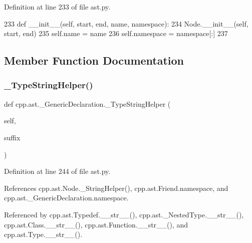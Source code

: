 Definition at line 233 of file ast.\+py.


\begin{DoxyCode}
233     \textcolor{keyword}{def }\_\_init\_\_(self, start, end, name, namespace):
234         Node.\_\_init\_\_(self, start, end)
235         self.name = name
236         self.namespace = namespace[:]
237 
\end{DoxyCode}


\subsection{Member Function Documentation}
\mbox{\label{classcpp_1_1ast_1_1__GenericDeclaration_a2ab2d07ccfa5d51ed153e82004c49e98}} 
\subsubsection{\texorpdfstring{\+\_\+\+Type\+String\+Helper()}{\_TypeStringHelper()}}
{\footnotesize\ttfamily def cpp.\+ast.\+\_\+\+Generic\+Declaration.\+\_\+\+Type\+String\+Helper (\begin{DoxyParamCaption}\item[{}]{self,  }\item[{}]{suffix }\end{DoxyParamCaption})\hspace{0.3cm}{\ttfamily [private]}}



Definition at line 244 of file ast.\+py.



References cpp.\+ast.\+Node.\+\_\+\+String\+Helper(), cpp.\+ast.\+Friend.\+namespace, and cpp.\+ast.\+\_\+\+Generic\+Declaration.\+namespace.



Referenced by cpp.\+ast.\+Typedef.\+\_\+\+\_\+str\+\_\+\+\_\+(), cpp.\+ast.\+\_\+\+Nested\+Type.\+\_\+\+\_\+str\+\_\+\+\_\+(), cpp.\+ast.\+Class.\+\_\+\+\_\+str\+\_\+\+\_\+(), cpp.\+ast.\+Function.\+\_\+\+\_\+str\+\_\+\+\_\+(), and cpp.\+ast.\+Type.\+\_\+\+\_\+str\+\_\+\+\_\+().


